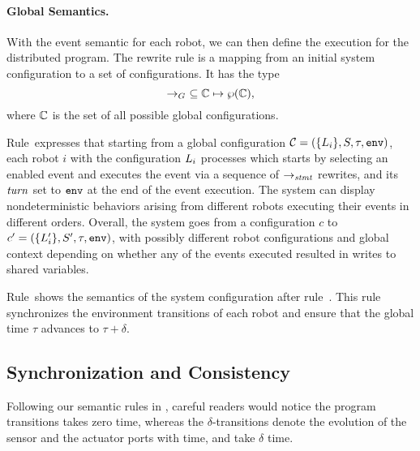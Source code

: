 \paragraph{Global Semantics.}

With the event semantic for each robot, we can then define the execution for the distributed \lgname program.
The rewrite rule is a mapping from an initial system configuration to a set of configurations.
It has the type
\[
\rightarrow_G\ \subseteq \mathbb{C} \mapsto \wp(\mathbb{C}),
\]
where $\mathbb{C}$ is the set of all possible global configurations.

Rule~\ProgTransRule expresses that starting from a global configuration $\mathcal{C} = (\{L_{i}\}, S, \tau, \mathtt{env})$,
each robot $i$ with the configuration $L_{i}$ processes which starts by selecting an enabled event and executes the event via a sequence of $\rightarrow_\mathit{stmt}$ rewrites,
and its $\mathit{turn}$ set to $\mathtt{env}$ at the end of the event execution.
The system can display nondeterministic behaviors arising from different robots executing their events in different orders.
Overall, the system goes from a configuration $c$ to $c^{\prime}= (\{L_{i}^\prime\}, S^{\prime}, \tau, \mathtt{env})$,
with possibly different robot configurations and global context depending on
whether any of the events executed resulted in writes to shared variables.

Rule~\EnvTransRule shows the semantics of the system configuration after rule~\ProgTransRule.
This rule synchronizes the environment transitions of each robot and
ensure that the global time $\tau$ advances to $\tau + \delta$.


\subsection{Synchronization and Consistency}
\label{sec:sync}

Following our semantic rules in ,
careful readers would notice the program transitions takes zero time,
whereas the $\delta$-transitions denote the evolution of the sensor and the actuator ports with time, and take $\delta$ time.

%


